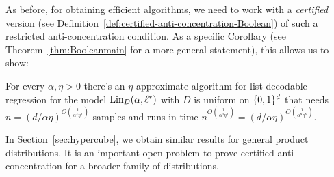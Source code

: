 As before, for obtaining efficient algorithms, we need to work with a \emph{certified} version (see Definition~\ref{def:certified-anti-concentration-Boolean}) of such a restricted anti-concentration condition. As a specific Corollary (see Theorem~\ref{thm:Booleanmain} for a more general statement), this allows us to show:
\begin{theorem} \label{thm:boolcube}
For every $\alpha, \eta > 0$ there's an $\eta$-approximate algorithm for list-decodable regression for the model $\mathrm{Lin}_D(\alpha,\ell^*)$ with $D$ is uniform on $\{0,1\}^d$ that needs $n = (d/\alpha \eta)^{O(\frac{1}{\alpha^4 \eta^4})}$  samples and runs in time $n^{O(\frac{1}{\alpha^4 \eta^4})} = (d/\alpha \eta)^{O(\frac{1}{\alpha^8 \eta^8})}$.
\end{theorem} 

In Section~\ref{sec:hypercube}, we obtain similar results for general product distributions. It is an important open problem to prove certified anti-concentration for a broader family of distributions. %




